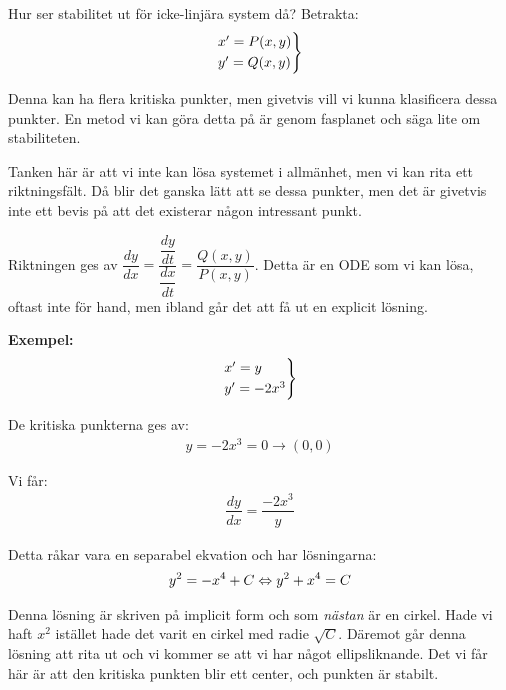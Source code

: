\noindent Hur ser stabilitet ut för icke-linjära system då? Betrakta:
\begin{equation*}
  \begin{gathered}
    \begin{rcases*}
      x^{\prime} = P(x,y)\\
      y^{\prime} = Q(x,y)
    \end{rcases*}
  \end{gathered}
\end{equation*}\par
\noindent Denna kan ha flera kritiska punkter, men givetvis vill vi kunna klasificera dessa punkter. En metod vi kan göra detta på är genom fasplanet och säga lite om stabiliteten.
\par\bigskip
\noindent Tanken här är att vi inte kan lösa systemet i allmänhet, men vi kan rita ett riktningsfält. Då blir det ganska lätt att se dessa punkter, men det är givetvis inte ett bevis på att det existerar någon intressant punkt.
\par\bigskip
\noindent Riktningen ges av $\dfrac{dy}{dx} = \dfrac{\dfrac{dy}{dt}}{\dfrac{dx}{dt}} = \dfrac{Q(x,y)}{P(x,y)}$. Detta är en ODE som vi kan lösa, oftast inte för hand, men ibland går det att få ut en explicit lösning.
\par\bigskip
\noindent\textbf{Exempel:}
\begin{equation*}
  \begin{gathered}
    \begin{rcases*}
      x^{\prime} = y\\
      y^{\prime} = -2x^3
    \end{rcases*}
  \end{gathered}
\end{equation*}\par
\noindent De kritiska punkterna ges av:
\begin{equation*}
  \begin{gathered}
    y = -2x^3=0\rightarrow (0,0)
  \end{gathered}
\end{equation*}\par
\noindent Vi får:
\begin{equation*}
  \begin{gathered}
    \dfrac{dy}{dx} = \dfrac{-2x^3}{y}
  \end{gathered}
\end{equation*}\par
\noindent Detta råkar vara en separabel ekvation och har lösningarna:
\begin{equation*}
  \begin{gathered}
    y^2 = -x^4+C \Leftrightarrow y^2+x^4=C
  \end{gathered}
\end{equation*}\par
\noindent Denna lösning är skriven på implicit form och som \textit{nästan} är en cirkel. Hade vi haft $x^2$ istället hade det varit en cirkel med radie $\sqrt{C}$. Däremot går denna lösning att rita ut och vi kommer se att vi har något ellipsliknande. Det vi får här är att den kritiska punkten blir ett center, och punkten är stabilt.
\par\bigskip
